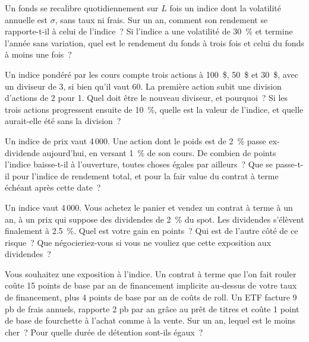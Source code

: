 \begin{question}\label{iq:iv2:etfs-futures-and-index-arbitrage:13}
Un fonds se recalibre quotidiennement sur $L$ fois un indice dont la volatilité annuelle est $\sigma$, sans taux ni frais. Sur un an, comment son rendement se rapporte-t-il à celui de l'indice~? Si l'indice a une volatilité de 30~\% et termine l'année sans variation, quel est le rendement du fonds à trois fois et celui du fonds à moins une fois~?
\end{question}

\begin{question}\label{iq:iv2:etfs-futures-and-index-arbitrage:14}
Un indice pondéré par les cours compte trois actions à 100~\$, 50~\$ et 30~\$, avec un diviseur de 3, si bien qu'il vaut 60. La première action subit une division d'actions de 2 pour 1. Quel doit être le nouveau diviseur, et pourquoi~? Si les trois actions progressent ensuite de 10~\%, quelle est la valeur de l'indice, et quelle aurait-elle été sans la division~?
\end{question}

\begin{question}\label{iq:iv2:etfs-futures-and-index-arbitrage:15}
Un indice de prix vaut 4\,000. Une action dont le poids est de 2~\% passe ex-dividende aujourd'hui, en versant 1~\% de son cours. De combien de points l'indice baisse-t-il à l'ouverture, toutes choses égales par ailleurs~? Que se passe-t-il pour l'indice de rendement total, et pour la fair value du contrat à terme échéant après cette date~?
\end{question}

\begin{question}\label{iq:iv2:etfs-futures-and-index-arbitrage:16}
Un indice vaut 4\,000. Vous achetez le panier et vendez un contrat à terme à un an, à un prix qui suppose des dividendes de 2~\% du spot. Les dividendes s'élèvent finalement à 2.5~\%. Quel est votre gain en points~? Qui est de l'autre côté de ce risque~? Que négocieriez-vous si vous ne vouliez que cette exposition aux dividendes~?
\end{question}

\begin{question}\label{iq:iv2:etfs-futures-and-index-arbitrage:17}
Vous souhaitez une exposition à l'indice. Un contrat à terme que l'on fait rouler coûte 15 points de base par an de financement implicite au-dessus de votre taux de financement, plus 4 points de base par an de coûts de roll. Un ETF facture 9 pb de frais annuels, rapporte 2 pb par an grâce au prêt de titres et coûte 1 point de base de fourchette à l'achat comme à la vente. Sur un an, lequel est le moins cher~? Pour quelle durée de détention sont-ils égaux~?
\end{question}

